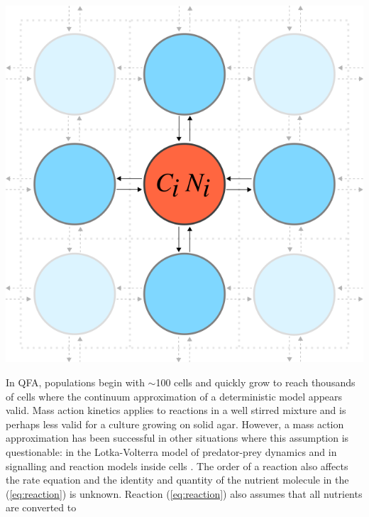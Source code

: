 \begin{Figure}
  \centering
  \includegraphics[width=\linewidth]{comp_model/comp_model_schematic2}
  \label{fig:comp_model_schematic}
\end{Figure}
%
In QFA, populations begin with \(\sim\)100 cells and quickly grow to
reach thousands of cells where the continuum approximation of a
deterministic model appears valid.  Mass action kinetics applies to
reactions in a well stirred mixture and is perhaps less valid for a
culture growing on solid agar.  However, a mass action approximation
has been successful in other situations where this assumption is
questionable: in the Lotka-Volterra model of predator-prey dynamics
\citep{Berryman1992} and in signalling and reaction models inside
cells \citep{Aldridge2006,Chen2010}. The order of a reaction also
affects the rate equation and the identity and quantity of the
nutrient molecule in the (\ref{eq:reaction}) is unknown. Reaction
(\ref{eq:reaction}) also assumes that all nutrients are converted to
